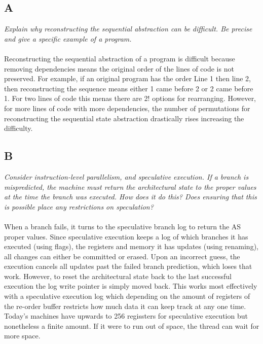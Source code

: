 \documentclass[10pt]{article}
\begin{document}
\subsection{A}
\textit{Explain why reconstructing the sequential abstraction can be difficult. Be precise and
give a specific example of a program.}
\paragraph{} Reconstructing the sequential abstraction of a program is difficult because removing dependencies
means the original order of the lines of code is not preserved. For example, if an original program has the order Line 1 then line 2, 
then reconstructing the sequence  means either 1 came before 2 or 2 came before 1. For two lines of code this menas there are 2! options for rearranging. 
However, for more lines of code with more dependencies, the number of permutations for reconstructing the sequential state abstraction drastically rises 
increasing the difficulty.   
\subsection{B}
\textit{Consider instruction-level parallelism, and speculative execution. If a branch is mispredicted, the machine must return the architectural state to the proper values at the
time the branch was executed. How does it do this? Does ensuring that this is possible
place any restrictions on speculation?}
\paragraph{} When a branch fails, it turns to the speculative branch log to return the AS proper values. Since speculative execution keeps a log of which branches it has 
executed (using flags), the registers and memory it has updates (using renaming), all changes can either be committed or erased. Upon an incorrect guess, the execution cancels 
all updates past the failed branch prediction, which loses that work. However, to reset the architectural state back to the last successful execution the log write pointer is 
simply moved back. This works most effectively with a speculative execution log which depending on the amount of registers of the re-order buffer 
restricts how much data it can keep track at any one time. Today's machines have upwards to 256 regissters for speculative execution but nonetheless a finite amount. If it were to run 
out of space, the thread can wait for more space. 
\end{document}
